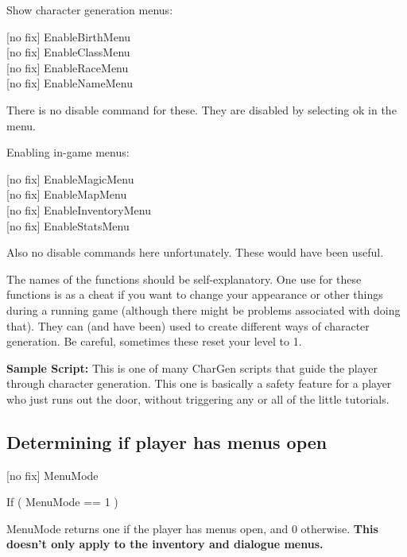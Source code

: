 
Show character generation menus:

{[}no fix{]} EnableBirthMenu\\
{[}no fix{]} EnableClassMenu\\
{[}no fix{]} EnableRaceMenu\\
{[}no fix{]} EnableNameMenu

There is no disable command for these. They are disabled by selecting ok
in the menu.


Enabling in-game menus:

{[}no fix{]} EnableMagicMenu\\
{[}no fix{]} EnableMapMenu\\
{[}no fix{]} EnableInventoryMenu\\
{[}no fix{]} EnableStatsMenu

Also no disable commands here unfortunately. These would have been
useful.

The names of the functions should be self-explanatory. One use for these
functions is as a cheat if you want to change your appearance or other
things during a running game (although there might be problems
associated with doing that). They can (and have been) used to create
different ways of character generation. Be careful, sometimes these
reset your level to 1.

\textbf{Sample Script:} This is one of many CharGen scripts that guide
the player through character generation. This one is basically a safety
feature for a player who just runs out the door, without triggering any
or all of the little tutorials.



\hypertarget{determining-if-player-has-menus-open}{%
\subsection{Determining if player has menus
open}\label{determining-if-player-has-menus-open}}

{[}no fix{]} MenuMode

If ( MenuMode == 1 )

MenuMode returns one if the player has menus open, and 0 otherwise.
\textbf{This doesn't only apply to the inventory and dialogue menus.}

